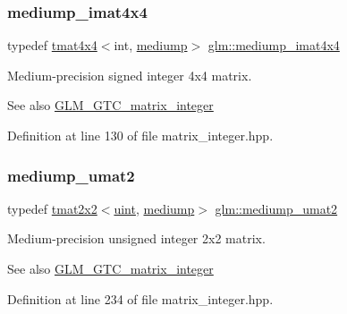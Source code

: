 \subsubsection{\texorpdfstring{mediump\_imat4x4}{mediump\_imat4x4}}
{\footnotesize\ttfamily typedef \mbox{\hyperlink{structglm_1_1tmat4x4}{tmat4x4}}$<$int, \mbox{\hyperlink{namespaceglm_a0f04f086094c747d227af4425893f545a6416f3ea0c9025fb21ed50c4d6620482}{mediump}}$>$ \mbox{\hyperlink{group__gtc__matrix__integer_gae226af929e72730be59a58d89a4be028}{glm\+::mediump\+\_\+imat4x4}}}

Medium-\/precision signed integer 4x4 matrix. \begin{DoxySeeAlso}{See also}
\mbox{\hyperlink{group__gtc__matrix__integer}{G\+L\+M\+\_\+\+G\+T\+C\+\_\+matrix\+\_\+integer}} 
\end{DoxySeeAlso}


Definition at line 130 of file matrix\+\_\+integer.\+hpp.

\mbox{\label{group__gtc__matrix__integer_ga85bc35173415dba31bb964c2940feeec}} 
\subsubsection{\texorpdfstring{mediump\_umat2}{mediump\_umat2}}
{\footnotesize\ttfamily typedef \mbox{\hyperlink{structglm_1_1tmat2x2}{tmat2x2}}$<$\mbox{\hyperlink{group__core__precision_ga4fd29415871152bfb5abd588334147c8}{uint}}, \mbox{\hyperlink{namespaceglm_a0f04f086094c747d227af4425893f545a6416f3ea0c9025fb21ed50c4d6620482}{mediump}}$>$ \mbox{\hyperlink{group__gtc__matrix__integer_ga85bc35173415dba31bb964c2940feeec}{glm\+::mediump\+\_\+umat2}}}

Medium-\/precision unsigned integer 2x2 matrix. \begin{DoxySeeAlso}{See also}
\mbox{\hyperlink{group__gtc__matrix__integer}{G\+L\+M\+\_\+\+G\+T\+C\+\_\+matrix\+\_\+integer}} 
\end{DoxySeeAlso}


Definition at line 234 of file matrix\+\_\+integer.\+hpp.

\mbox{\label{group__gtc__matrix__integer_gafce8777b8b0d9d7f810853b22de3be1b}} 
